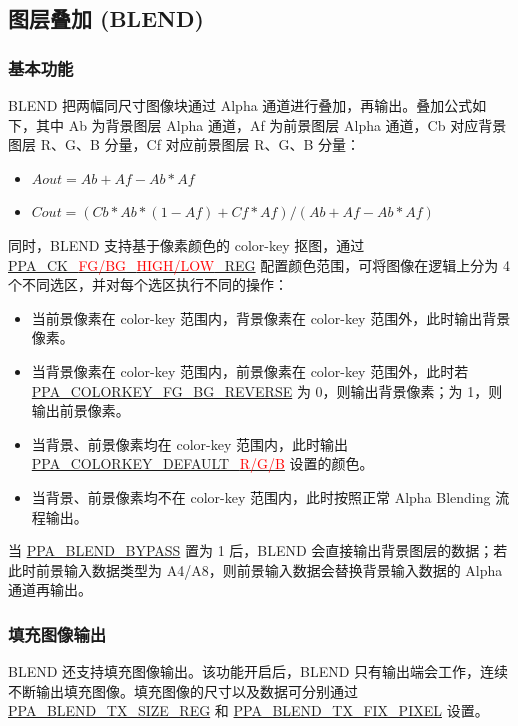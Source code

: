 \documentclass[main\_\_CN.tex]{subfiles}
\begin{document}
\subsection{图层叠加 (BLEND)}

\subsubsection{基本功能}
BLEND 把两幅同尺寸图像块通过 Alpha 通道进行叠加，再输出。叠加公式如下，其中 Ab 为背景图层 Alpha 通道，Af 为前景图层 Alpha 通道，Cb 对应背景图层 R、G、B 分量，Cf 对应前景图层 R、G、B 分量：
\begin{itemize}
    \item $Aout = Ab + Af - Ab*Af$
    \item $Cout = (Cb*Ab*(1-Af) + Cf*Af) / (Ab + Af - Ab*Af)$
\end{itemize}

同时，BLEND 支持基于像素颜色的 color-key 抠图，通过 \hyperref[regdesc:PPACKBGLOWREG]{PPA\_CK\_\textcolor{red}{FG/BG}\_\textcolor{red}{HIGH/LOW}\_REG} 配置颜色范围，可将图像在逻辑上分为 4 个不同选区，并对每个选区执行不同的操作：
\begin{itemize}
    \item 当前景像素在 color-key 范围内，背景像素在 color-key 范围外，此时输出背景像素。
    \item 当背景像素在 color-key 范围内，前景像素在 color-key 范围外，此时若 \hyperref[fielddesc:PPACOLORKEYFGBGREVERSE]{PPA\_COLORKEY\_FG\_BG\_REVERSE} 为 0，则输出背景像素；为 1，则输出前景像素。
    \item 当背景、前景像素均在 color-key 范围内，此时输出 \hyperref[fielddesc:PPACOLORKEYDEFAULTB]{PPA\_COLORKEY\_DEFAULT\_\textcolor{red}{R/G/B}} 设置的颜色。
    \item 当背景、前景像素均不在 color-key 范围内，此时按照正常 Alpha Blending 流程输出。
\end{itemize}

当 \hyperref[fielddesc:PPABLENDBYPASS]{PPA\_BLEND\_BYPASS} 置为 1 后，BLEND 会直接输出背景图层的数据；若此时前景输入数据类型为 A4/A8，则前景输入数据会替换背景输入数据的 Alpha 通道再输出。

\subsubsection{填充图像输出}
BLEND 还支持填充图像输出。该功能开启后，BLEND 只有输出端会工作，连续不断输出填充图像。填充图像的尺寸以及数据可分别通过 \hyperref[regdesc:PPABLENDTXSIZEREG]{PPA\_BLEND\_TX\_SIZE\_REG} 和 \hyperref[fielddesc:PPABLENDTXFIXPIXEL]{PPA\_BLEND\_TX\_FIX\_PIXEL} 设置。
\end{document}
